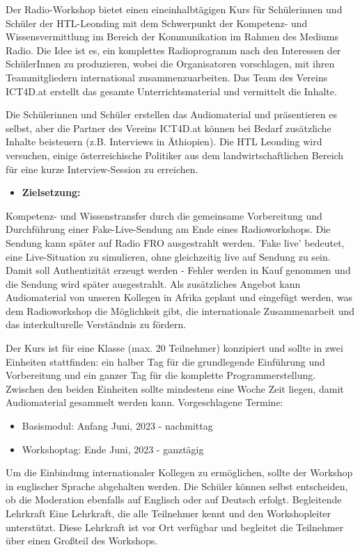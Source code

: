 Der Radio-Workshop bietet einen eineinhalbtägigen Kurs für Schülerinnen und Schüler der HTL-Leonding mit dem Schwerpunkt der Kompetenz- und Wissensvermittlung im Bereich der Kommunikation im Rahmen des Mediums Radio. Die Idee ist es, ein komplettes Radioprogramm nach den Interessen der SchülerInnen zu produzieren, wobei die Organisatoren vorschlagen, mit ihren Teammitgliedern international zusammenzuarbeiten. Das Team des Vereins ICT4D.at erstellt das gesamte Unterrichtsmaterial und vermittelt die Inhalte.

Die Schülerinnen und Schüler erstellen das Audiomaterial und präsentieren es selbst, aber die Partner des Vereins ICT4D.at können bei Bedarf zusätzliche Inhalte beisteuern (z.B. Interviews in Äthiopien). Die HTL Leonding wird versuchen, einige österreichische Politiker aus dem landwirtschaftlichen Bereich für eine kurze Interview-Session zu erreichen.

\begin{itemize}
    \item \textbf{Zielsetzung:}
\end{itemize}

Kompetenz- und Wissenstransfer durch die
gemeinsame Vorbereitung und Durchführung einer Fake-Live-Sendung am Ende eines Radioworkshops. Die Sendung kann später auf Radio FRO ausgestrahlt werden. 'Fake live' bedeutet, eine Live-Situation zu simulieren, ohne gleichzeitig live auf Sendung zu sein. Damit soll Authentizität erzeugt werden - Fehler werden in Kauf genommen und die Sendung wird später ausgestrahlt. Als zusätzliches Angebot kann Audiomaterial von unseren Kollegen in Afrika geplant und eingefügt werden, was dem Radioworkshop die Möglichkeit gibt, die internationale Zusammenarbeit und das interkulturelle Verständnis zu fördern.

Der Kurs ist für eine Klasse (max. 20 Teilnehmer) konzipiert und sollte in zwei Einheiten stattfinden: ein halber Tag für die grundlegende Einführung und Vorbereitung und ein ganzer Tag für die komplette Programmerstellung. Zwischen den beiden Einheiten sollte mindestens eine Woche Zeit liegen, damit Audiomaterial gesammelt werden kann.
Vorgeschlagene Termine:

\begin{itemize}
    \item {Basismodul: Anfang Juni, 2023 - nachmittag}
    \item {Workshoptag: Ende Juni, 2023 - ganztägig}
\end{itemize}

Um die Einbindung internationaler Kollegen zu ermöglichen, sollte der Workshop in englischer Sprache abgehalten werden. Die Schüler können selbst entscheiden, ob die Moderation ebenfalls auf Englisch oder auf Deutsch erfolgt.
Begleitende Lehrkraft
Eine Lehrkraft, die alle Teilnehmer kennt und den Workshopleiter unterstützt. Diese Lehrkraft ist vor Ort verfügbar und begleitet die Teilnehmer über einen Großteil des Workshops.


